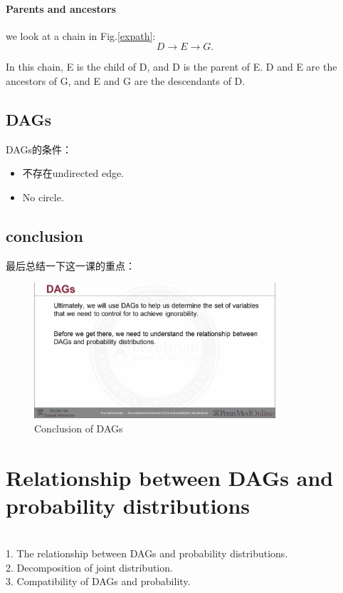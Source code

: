 \paragraph{Parents and ancestors} we look at a chain in Fig.\ref{expath}: 
\begin{equation}
D \longrightarrow E \longrightarrow G.
\end{equation}
	
	In this chain, E is the child of D, and D is the parent of E. D and E are the ancestors of G, and E and G are the descendants of D.


\subsection{DAGs}
DAGs的条件：
\begin{itemize}
	\item 不存在undirected edge.
	\item No circle.
\end{itemize}

\subsection{conclusion}
最后总结一下这一课的重点：
\begin{figure}[htbp]
	\setlength{\abovecaptionskip}{0pt}     %
	\setlength{\belowcaptionskip}{10pt}
	\vspace{-0cm}  %
	\setlength{\abovecaptionskip}{-0cm}   %
	\setlength{\belowcaptionskip}{-0cm}   %
	\centering
	\includegraphics[width=0.8\textwidth]{figure/dagconclusion.jpg}
	\caption{Conclusion of DAGs}
	\label{dagconclusion}
\end{figure}


\newpage \section{Relationship between DAGs and probability distributions}
\\
1. The relationship between DAGs and probability distributions.\\
2. Decomposition of joint distribution.\\
3. Compatibility of DAGs and probability.
